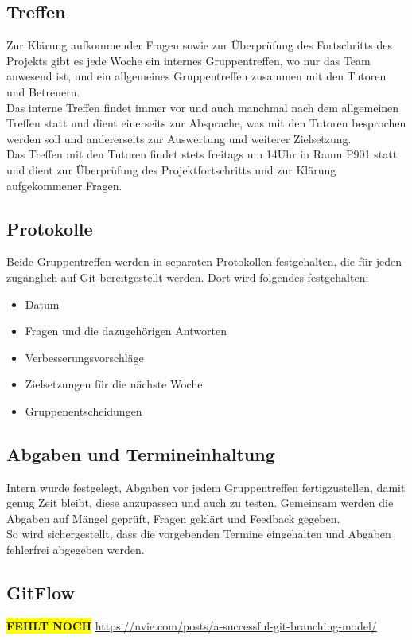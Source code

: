 \documentclass[11pt,a4paper]{report}
\begin{document}
\subsection{Treffen}
Zur Klärung aufkommender Fragen sowie zur Überprüfung des Fortschritts des Projekts gibt es jede Woche ein internes Gruppentreffen, wo nur das Team anwesend ist, und ein allgemeines Gruppentreffen zusammen mit den Tutoren und Betreuern.\\
Das interne Treffen findet immer vor und auch manchmal nach dem allgemeinen Treffen statt und dient einerseits zur Absprache, was mit den Tutoren besprochen werden soll und andererseits zur Auswertung und weiterer Zielsetzung.\\
Das Treffen mit den Tutoren findet stets freitags um 14Uhr in Raum P901 statt und dient zur Überprüfung des Projektfortschritts und zur Klärung aufgekommener Fragen.

\subsection{Protokolle}
Beide Gruppentreffen werden in separaten Protokollen festgehalten, die für jeden zugänglich auf Git bereitgestellt werden. Dort wird folgendes festgehalten:
\begin{itemize}
\item Datum
\item Fragen und die dazugehörigen Antworten
\item Verbesserungsvorschläge 
\item Zielsetzungen für die nächste Woche
\item Gruppenentscheidungen
\end{itemize}
\subsection{Abgaben und Termineinhaltung}
Intern wurde festgelegt, Abgaben vor jedem Gruppentreffen fertigzustellen, damit genug Zeit bleibt, diese anzupassen und auch zu testen. Gemeinsam werden die Abgaben auf Mängel geprüft, Fragen geklärt und Feedback gegeben.\\
So wird sichergestellt, dass die vorgebenden Termine eingehalten und Abgaben fehlerfrei abgegeben werden.
\subsection{GitFlow}
\textbf{\colorbox{yellow}{FEHLT NOCH}} \url{https://nvie.com/posts/a-successful-git-branching-model/}
\end{document}

